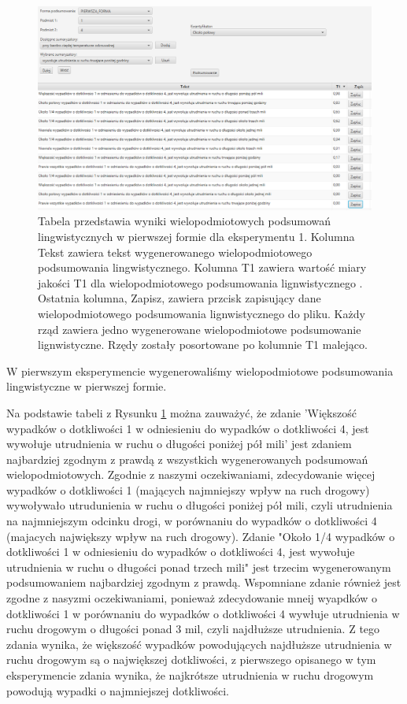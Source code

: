 \documentclass{classrep}
\begin{document}
\begin{figure}[h!]
 \centering
 \includegraphics[width=15cm]{ex_wiel1.png}
 \vspace{-0.3cm}
 \caption{Tabela przedstawia wyniki wielopodmiotowych podsumowań lingwistycznych w pierwszej formie dla eksperymentu 1. Kolumna Tekst zawiera tekst wygenerowanego wielopodmiotowego podsumowania lingwistycznego. Kolumna T1 zawiera wartość miary jakości T1 dla wielopodmiotowego podsumowania lignwistycznego \cite{niewiadomski19}. Ostatnia kolumna, Zapisz, zawiera przcisk zapisujący dane wielopodmiotowego podsumowania lignwistycznego do pliku. Każdy rząd zawiera jedno wygenerowane wielopodmiotowe podsumowanie lignwistyczne. Rzędy zostały posortowane po kolumnie T1 malejąco.  }
 \label{wykr_ex_wiel1}
\end{figure}
\newpage

W pierwszym eksperymencie wygenerowaliśmy wielopodmiotowe podsumowania lingwistyczne w pierwszej formie. 

Na podstawie tabeli z Rysunku \ref{wykr_ex_wiel1} można zauważyć, że zdanie 'Większość wypadków o dotkliwości 1 w odniesieniu do wypadków o dotkliwości 4, jest wywołuje utrudnienia w ruchu o długości poniżej pół mili' jest zdaniem najbardziej zgodnym z prawdą z wszystkich wygenerowanych podsumowań wielopodmiotowych. Zgodnie z naszymi oczekiwaniami, zdecydowanie więcej wypadków o dotkliwości 1 (mających najmniejszy wpływ na ruch drogowy) wywoływało utrudunienia w ruchu o długości poniżej pół mili, czyli utrudnienia na najmniejszym odcinku drogi, w porównaniu do wypadków o dotkliwości 4 (majacych największy wpływ na ruch drogowy).  Zdanie "Około 1/4 wypadków o dotkliwości 1 w odniesieniu do wypadków o dotkliwości 4, jest wywołuje utrudnienia w ruchu o długości ponad trzech mili" jest trzecim wygenerowanym podsumowaniem najbardziej zgodnym z prawdą. Wspomniane zdanie również jest zgodne z nasyzmi oczekiwaniami, ponieważ zdecydowanie mneij wyapdków o dotkliwości 1  w porównaniu do wypadków o dotkliwości 4 wywłuje utrudnienia w ruchu drogowym o długości ponad 3 mil, czyli najdłuższe utrudnienia. Z tego zdania wynika, że większość wypadków powodujących najdłuższe utrudnienia w ruchu drogowym są o największej dotkliwości, z pierwszego opisanego w tym eksperymencie zdania wynika, że najkrótsze utrudnienia w ruchu drogowym powodują wypadki o najmniejszej dotkliwości. 
\end{document}
